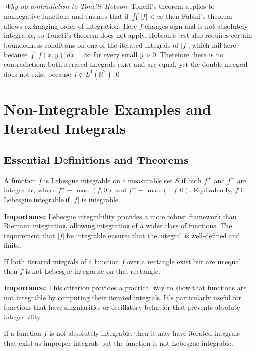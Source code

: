 \emph{Why no contradiction to Tonelli--Hobson.}
Tonelli's theorem applies to nonnegative functions and ensures that if \(\iint |f| < \infty\) then Fubini's theorem allows exchanging order of integration.  
Here \(f\) changes sign and is not absolutely integrable, so Tonelli's theorem does not apply.  
Hobson's test also requires certain boundedness conditions on one of the iterated integrals of \(|f|\), which fail here because \(\int |f(x,y)|\, dx = \infty\) for every small \(y > 0\).  
Therefore there is no contradiction: both iterated integrals exist and are equal, yet the double integral does not exist because \(f \notin L^1(\mathbb{R}^2)\).\qed
\section{Non-Integrable Examples and Iterated Integrals}

\subsection*{Essential Definitions and Theorems}

\begin{definition}
A function $f$ is Lebesgue integrable on a measurable set $S$ if both $f^+$ and $f^-$ are integrable, where $f^+ = \max(f, 0)$ and $f^- = \max(-f, 0)$. Equivalently, $f$ is Lebesgue integrable if $|f|$ is integrable.
\end{definition}

\noindent\textbf{Importance:} Lebesgue integrability provides a more robust framework than Riemann integration, allowing integration of a wider class of functions. The requirement that $|f|$ be integrable ensures that the integral is well-defined and finite.



\begin{theorem}
If both iterated integrals of a function $f$ over a rectangle exist but are unequal, then $f$ is not Lebesgue integrable on that rectangle.
\end{theorem}

\noindent\textbf{Importance:} This criterion provides a practical way to show that functions are not integrable by computing their iterated integrals. It's particularly useful for functions that have singularities or oscillatory behavior that prevents absolute integrability.



\begin{theorem}
If a function $f$ is not absolutely integrable, then it may have iterated integrals that exist as improper integrals but the function is not Lebesgue integrable.
\end{theorem}

